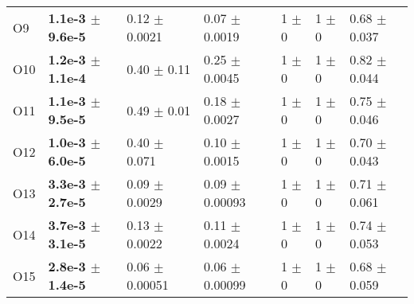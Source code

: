 \begin{table}[!htb]
\begin{tabular}{lllllll}
        O9     &  \textbf{1.1e-3 $\pm$  9.6e-5} &  0.12 $\pm$  0.0021   &  0.07 $\pm$  0.0019   &  1  $\pm$  0  &  1  $\pm$  0 &  0.68 $\pm$  0.037 \\
        O10    &  \textbf{1.2e-3 $\pm$  1.1e-4} &  0.40 $\pm$  0.11     &  0.25 $\pm$  0.0045   &  1  $\pm$  0  &  1  $\pm$  0 &  0.82 $\pm$  0.044 \\
        O11    &  \textbf{1.1e-3 $\pm$  9.5e-5} &  0.49 $\pm$  0.01     &  0.18 $\pm$  0.0027   &  1  $\pm$  0  &  1  $\pm$  0 &  0.75 $\pm$  0.046 \\
        O12    &  \textbf{1.0e-3 $\pm$  6.0e-5} &  0.40 $\pm$  0.071    &  0.10 $\pm$  0.0015   &  1  $\pm$  0  &  1  $\pm$  0 &  0.70 $\pm$  0.043 \\
        O13    &  \textbf{3.3e-3 $\pm$  2.7e-5} &  0.09 $\pm$  0.0029   &  0.09 $\pm$  0.00093  &  1  $\pm$  0  &  1  $\pm$  0 &  0.71 $\pm$  0.061 \\
        O14    &  \textbf{3.7e-3 $\pm$  3.1e-5} &  0.13 $\pm$  0.0022   &  0.11 $\pm$  0.0024   &  1  $\pm$  0  &  1  $\pm$  0 &  0.74 $\pm$  0.053 \\
        O15    &  \textbf{2.8e-3 $\pm$  1.4e-5} &  0.06 $\pm$  0.00051  &  0.06 $\pm$  0.00099  &  1  $\pm$  0  &  1  $\pm$  0 &  0.68 $\pm$  0.059 \\
        \bottomrule
    \end{tabular}
\end{table}

